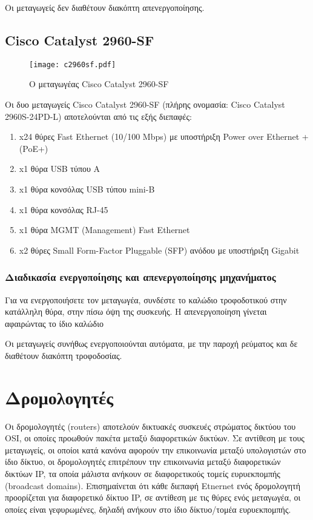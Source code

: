 \documentclass{EdipyLabs} %
\begin{document}
Οι μεταγωγείς δεν διαθέτουν διακόπτη απενεργοποίησης. 

\newpage
\subsection{Cisco Catalyst 2960-SF}
\begin{figure}[H]
	\centering
	\texttt{[image: c2960sf.pdf]}
	\caption{Ο μεταγωγέας Cisco Catalyst 2960-SF}\label{fig:c2960sf}
\end{figure}
Οι δυο μεταγωγείς Cisco Catalyst 2960-SF (πλήρης ονομασία: Cisco Catalyst 2960S-24PD-L) αποτελούνται από τις εξής διεπαφές:
\begin{enumerate}
	\item x24 θύρες Fast Ethernet (10/100 Mbps) με υποστήριξη Power over Ethernet + (PoE+)
	\item x1 θύρα USB τύπου A
	\item x1 θύρα κονσόλας USB τύπου mini-B
	\item x1 θύρα κονσόλας RJ-45
	\item x1 θύρα MGMT (Management) Fast Ethernet
	\item x2 θύρες Small Form-Factor Pluggable (SFP) ανόδου με υποστήριξη Gigabit
\end{enumerate}

\subsubsection*{Διαδικασία ενεργοποίησης και απενεργοποίησης μηχανήματος}
Για να ενεργοποιήσετε τον μεταγωγέα, συνδέστε το καλώδιο τροφοδοτικού στην κατάλληλη θύρα, στην πίσω όψη της συσκευής. Η απενεργοποίηση γίνεται αφαιρώντας το ίδιο καλώδιο

Οι μεταγωγείς συνήθως ενεργοποιούνται αυτόματα, με την παροχή ρεύματος και δε διαθέτουν διακόπτη τροφοδοσίας.

\newpage

\section{Δρομολογητές}

Οι δρομολογητές (routers) αποτελούν δικτυακές συσκευές στρώματος δικτύου του OSI, οι οποίες προωθούν πακέτα μεταξύ διαφορετικών δικτύων. Σε αντίθεση με τους μεταγωγείς, οι οποίοι κατά κανόνα αφορούν την επικοινωνία μεταξύ υπολογιστών στο ίδιο δίκτυο, οι δρομολογητές επιτρέπουν την επικοινωνία μεταξύ διαφορετικών δικτύων IP, τα οποία μάλιστα ανήκουν σε διαφορετικούς τομείς ευρυεκπομπής (broadcast domains). Επισημαίνεται ότι κάθε διεπαφή Etnernet ενός δρομολογητή προορίζεται για διαφορετικό δίκτυο IP, σε αντίθεση με τις θύρες ενός μεταγωγέα, οι οποίες είναι γεφυρωμένες, δηλαδή ανήκουν στο ίδιο δίκτυο/τομέα ευρυεκπομπής. 
\end{document}
